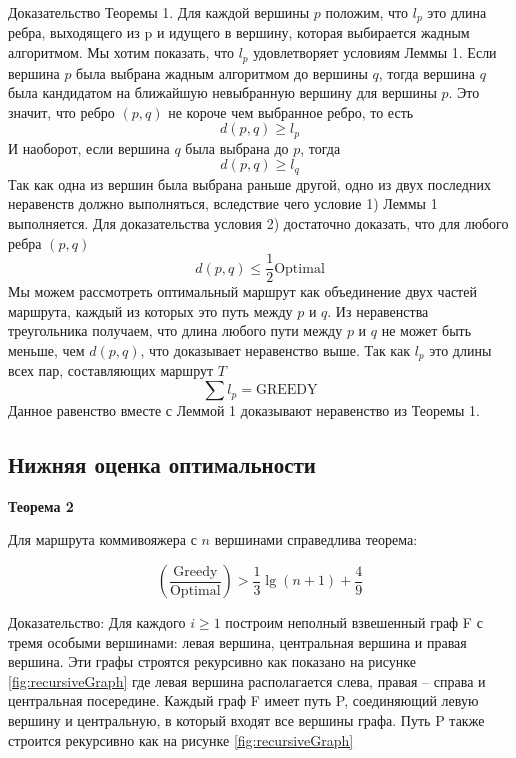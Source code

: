 \documentclass[a4paper, 14pt]{extarticle}
\numberwithin{equation}{section}
\begin{document}
Доказательство Теоремы 1. Для каждой  вершины $p$ положим, что $l_p$ это длина ребра, выходящего из p и идущего в вершину, которая выбирается жадным алгоритмом. Мы хотим показать, что $l_p$ удовлетворяет условиям Леммы 1. Если вершина $p$ была выбрана жадным алгоритмом до вершины $q$, тогда вершина $q$ была кандидатом на ближайшую невыбранную вершину для вершины $p$. Это значит, что ребро $(p,q)$ не короче чем выбранное ребро, то есть
\begin{equation}
d(p,q) \geqslant l_p
\end{equation}
И наоборот, если вершина $q$ была выбрана до $p$, тогда
\begin{equation}
d(p,q) \geqslant l_q
\end{equation}
Так как одна из вершин была выбрана раньше другой, одно из двух последних неравенств должно выполняться, вследствие чего  условие 1) Леммы 1 выполняется. Для доказательства условия 2) достаточно доказать, что для любого ребра $(p,q)$
\begin{equation}
d(p,q) \leqslant \frac{1}{2} \mathrm{Optimal}
\end{equation}
Мы можем рассмотреть оптимальный маршрут как объединение двух частей маршрута, каждый из которых это путь между $p$ и $q$. Из неравенства треугольника получаем, что длина любого пути между $p$ и $q$ не может быть меньше, чем $d(p,q)$, что доказывает неравенство выше. Так как $l_p$ это длины всех пар, составляющих маршрут $T$
\begin{equation}
\sum l_p = \mathrm{GREEDY}
\end{equation}
Данное равенство вместе с Леммой 1 доказывают неравенство из Теоремы 1.\\

\subsection{Нижняя оценка оптимальности}


\textbf{Теорема 2}

Для маршрута коммивояжера с $n$ вершинами справедлива теорема:

\begin{equation}
	(\frac{\mathrm{Greedy}}{\mathrm{Optimal}}) > \frac{1}{3}{\lg (n+1)} + \frac{4}{9}
\end{equation}

Доказательство:  Для каждого $i \geqslant 1 $ построим неполный взвешенный граф F с тремя особыми вершинами: левая вершина, центральная вершина и правая вершина. Эти графы строятся рекурсивно как показано на рисунке \eqref{fig:recursiveGraph} где левая вершина располагается слева, правая -- справа и центральная посередине. Каждый граф F имеет путь P, соединяющий левую вершину и центральную, в который входят все вершины графа. Путь P также строится рекурсивно как на рисунке \eqref{fig:recursiveGraph} 
\end{document}
